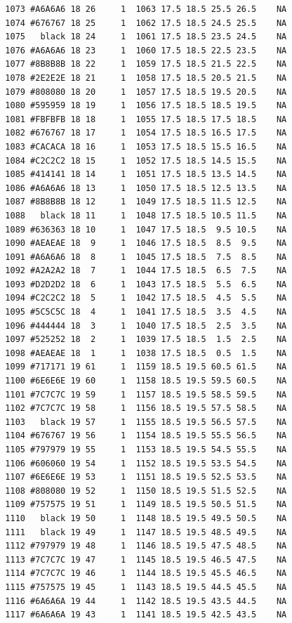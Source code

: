 \documentclass[12pt,twoside]{reedthesis}
\begin{document}
\begin{verbatim}
  1073 #A6A6A6 18 26     1  1063 17.5 18.5 25.5 26.5    NA
  1074 #676767 18 25     1  1062 17.5 18.5 24.5 25.5    NA
  1075   black 18 24     1  1061 17.5 18.5 23.5 24.5    NA
  1076 #A6A6A6 18 23     1  1060 17.5 18.5 22.5 23.5    NA
  1077 #8B8B8B 18 22     1  1059 17.5 18.5 21.5 22.5    NA
  1078 #2E2E2E 18 21     1  1058 17.5 18.5 20.5 21.5    NA
  1079 #808080 18 20     1  1057 17.5 18.5 19.5 20.5    NA
  1080 #595959 18 19     1  1056 17.5 18.5 18.5 19.5    NA
  1081 #FBFBFB 18 18     1  1055 17.5 18.5 17.5 18.5    NA
  1082 #676767 18 17     1  1054 17.5 18.5 16.5 17.5    NA
  1083 #CACACA 18 16     1  1053 17.5 18.5 15.5 16.5    NA
  1084 #C2C2C2 18 15     1  1052 17.5 18.5 14.5 15.5    NA
  1085 #414141 18 14     1  1051 17.5 18.5 13.5 14.5    NA
  1086 #A6A6A6 18 13     1  1050 17.5 18.5 12.5 13.5    NA
  1087 #8B8B8B 18 12     1  1049 17.5 18.5 11.5 12.5    NA
  1088   black 18 11     1  1048 17.5 18.5 10.5 11.5    NA
  1089 #636363 18 10     1  1047 17.5 18.5  9.5 10.5    NA
  1090 #AEAEAE 18  9     1  1046 17.5 18.5  8.5  9.5    NA
  1091 #A6A6A6 18  8     1  1045 17.5 18.5  7.5  8.5    NA
  1092 #A2A2A2 18  7     1  1044 17.5 18.5  6.5  7.5    NA
  1093 #D2D2D2 18  6     1  1043 17.5 18.5  5.5  6.5    NA
  1094 #C2C2C2 18  5     1  1042 17.5 18.5  4.5  5.5    NA
  1095 #5C5C5C 18  4     1  1041 17.5 18.5  3.5  4.5    NA
  1096 #444444 18  3     1  1040 17.5 18.5  2.5  3.5    NA
  1097 #525252 18  2     1  1039 17.5 18.5  1.5  2.5    NA
  1098 #AEAEAE 18  1     1  1038 17.5 18.5  0.5  1.5    NA
  1099 #717171 19 61     1  1159 18.5 19.5 60.5 61.5    NA
  1100 #6E6E6E 19 60     1  1158 18.5 19.5 59.5 60.5    NA
  1101 #7C7C7C 19 59     1  1157 18.5 19.5 58.5 59.5    NA
  1102 #7C7C7C 19 58     1  1156 18.5 19.5 57.5 58.5    NA
  1103   black 19 57     1  1155 18.5 19.5 56.5 57.5    NA
  1104 #676767 19 56     1  1154 18.5 19.5 55.5 56.5    NA
  1105 #797979 19 55     1  1153 18.5 19.5 54.5 55.5    NA
  1106 #606060 19 54     1  1152 18.5 19.5 53.5 54.5    NA
  1107 #6E6E6E 19 53     1  1151 18.5 19.5 52.5 53.5    NA
  1108 #808080 19 52     1  1150 18.5 19.5 51.5 52.5    NA
  1109 #757575 19 51     1  1149 18.5 19.5 50.5 51.5    NA
  1110   black 19 50     1  1148 18.5 19.5 49.5 50.5    NA
  1111   black 19 49     1  1147 18.5 19.5 48.5 49.5    NA
  1112 #797979 19 48     1  1146 18.5 19.5 47.5 48.5    NA
  1113 #7C7C7C 19 47     1  1145 18.5 19.5 46.5 47.5    NA
  1114 #7C7C7C 19 46     1  1144 18.5 19.5 45.5 46.5    NA
  1115 #757575 19 45     1  1143 18.5 19.5 44.5 45.5    NA
  1116 #6A6A6A 19 44     1  1142 18.5 19.5 43.5 44.5    NA
  1117 #6A6A6A 19 43     1  1141 18.5 19.5 42.5 43.5    NA

\end{verbatim}
\end{document}
